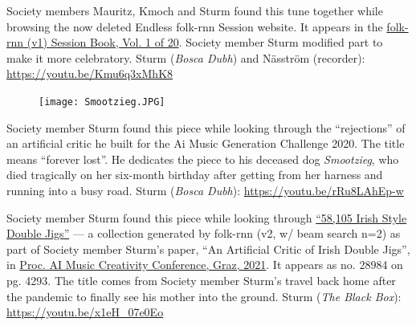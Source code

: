 \documentclass[a4paper,notitlepage,twoside]{book}
\begin{document}
{}  
\hypertarget{piece:CuckoosWedding}{}
Society members Mauritz, Kmoch and Sturm found this tune together 
while browsing the now deleted Endless folk-rnn Session website.
It appears in the \href{https://highnoongmt.wordpress.com/2018/01/05/volumes-1-20-of-folk-rnn-v1-transcriptions}{folk-rnn (v1) Session Book, Vol. 1 of 20}.
Society member Sturm modified part to make it more celebratory.
Sturm ({\em Bosca Dubh}) and Näsström (recorder): \url{https://youtu.be/Kmu6q3xMhK8}

{}  
\hypertarget{piece:EvigtForlorad}{}
\begin{figure}
\vspace{-0.3in}
\texttt{[image: Smootzieg.JPG]}
\end{figure}
Society member Sturm found this piece while looking through
the ``rejections'' of an artificial critic he built for the 
Ai Music Generation Challenge 2020.
The title means ``forever lost''.
He dedicates the piece to his deceased dog {\em Smootzieg},
who died tragically on her six-month birthday after 
getting from her harness and running into a busy road.
Sturm ({\em Bosca Dubh}): \url{https://youtu.be/rRu8LAhEp-w}

\clearpage
{}
{}  
\hypertarget{piece:HeadingHome}{}
Society member Sturm found this piece 
while looking through 
\href{http://urn.kb.se/resolve?urn=urn:nbn:se:kth:diva-296578}{``58,105 Irish Style Double Jigs''} ---
a collection generated by folk-rnn (v2, w/ beam search n=2)
as part of Society member Sturm's paper,
``An Artificial Critic of Irish Double Jigs'', in \href{https://aimc2021.iem.at/program/papers/}{Proc. AI Music Creativity Conference, Graz, 2021}.
It appears as no. 28984 on pg. 4293.
The title comes from Society member Sturm's
travel back home after the pandemic to finally
see his mother into the ground.
Sturm ({\em The Black Box}): \url{https://youtu.be/x1eH_07e0Eo}
\end{document}
